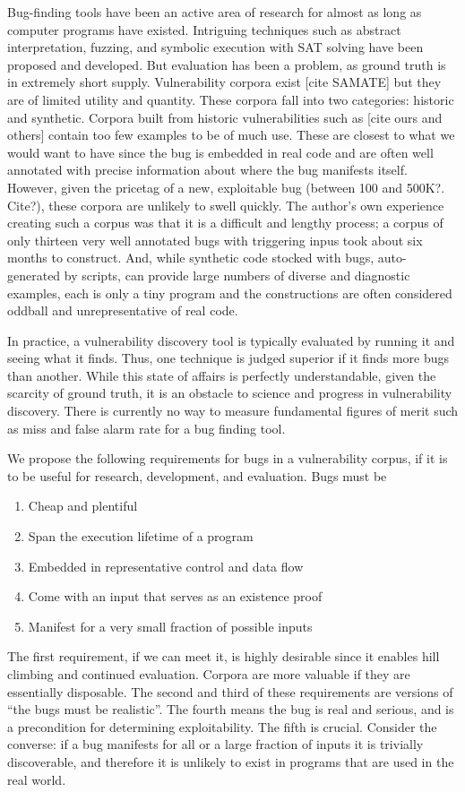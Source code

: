 \label{sec:motivation}

Bug-finding tools have been an active area of research for almost as long as computer programs have existed. 
Intriguing techniques such as abstract interpretation, fuzzing, and symbolic execution with SAT solving have been proposed and developed.
But evaluation has been a problem, as  ground truth is in extremely short supply.
Vulnerability corpora exist [cite SAMATE] but they are of limited utility and quantity.
These corpora fall into two categories: historic and synthetic.
Corpora built from historic vulnerabilities such as [cite ours and others] contain too few examples to be of much use.
These are closest to what we would want to have since the bug is embedded in real code and are often well annotated with precise information about where the bug manifests itself.
However, given the pricetag of a new, exploitable bug (between 100 and 500K?. Cite?), these corpora are unlikely to swell quickly.
The author's own experience creating such a corpus was that it is a difficult and lengthy process; a corpus of only thirteen very well annotated bugs with triggering inpus took about six months to construct. 
And, while synthetic code stocked with bugs, auto-generated by scripts, can provide large numbers of diverse and diagnostic examples, each is only a tiny program and the constructions are often considered oddball and unrepresentative of real code.

In practice, a vulnerability discovery tool is typically evaluated by running it and seeing what it finds. 
Thus, one technique is judged superior if it finds more bugs than another.
While this state of affairs is perfectly understandable, given the scarcity of ground truth, it is an obstacle to science and progress in vulnerability discovery.
There is currently no way to measure fundamental figures of merit such as miss and false alarm rate for a bug finding tool.

We propose the following requirements for bugs in a vulnerability corpus, if it is to be useful for research, development, and evaluation.
Bugs must be
\begin{enumerate}
\item Cheap and plentiful
\item Span the execution lifetime of a program
\item Embedded in representative control and data flow
\item Come with an input that serves as an existence proof 
\item Manifest for a very small fraction of possible inputs
\end {enumerate}
The first requirement, if we can meet it, is highly desirable since it enables hill climbing and continued evaluation.
Corpora are more valuable if they are essentially disposable. 
The second and third of these requirements are versions of ``the bugs must be realistic''.
The fourth means the bug is real and serious, and is a precondition for determining exploitability. 
The fifth is crucial.
Consider the converse: if a bug manifests for all or a large fraction of inputs it is trivially discoverable, and therefore it is unlikely to exist in programs that are used in the real world.

